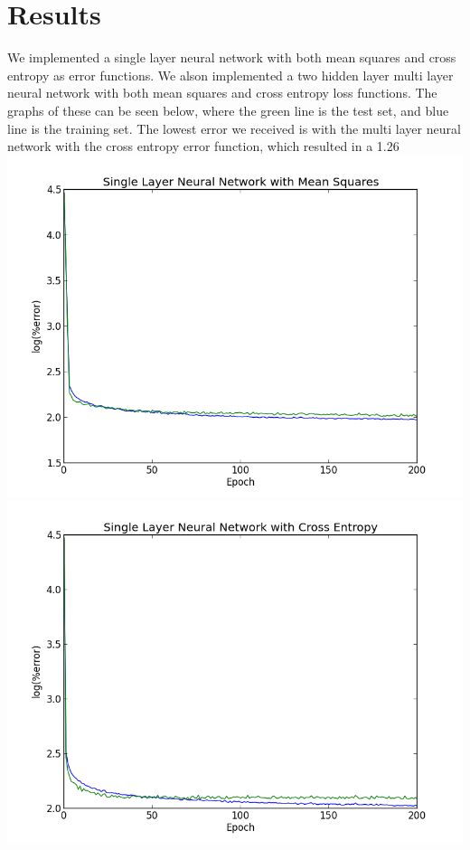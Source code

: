 \documentclass{article}
\begin{document}
\section*{Results}
We implemented a single layer neural network with both mean squares and cross entropy as error functions. We alson implemented a two hidden layer multi layer neural network with both mean squares and cross entropy loss functions. The graphs of these can be seen below, where the green line is the test set, and blue line is the training set. The lowest error we received is with the multi layer neural network with the cross entropy error function, which resulted in a 1.26%
\includegraphics[width=\textwidth]{slms}
\includegraphics[width=\textwidth]{slce}
\end{document}
